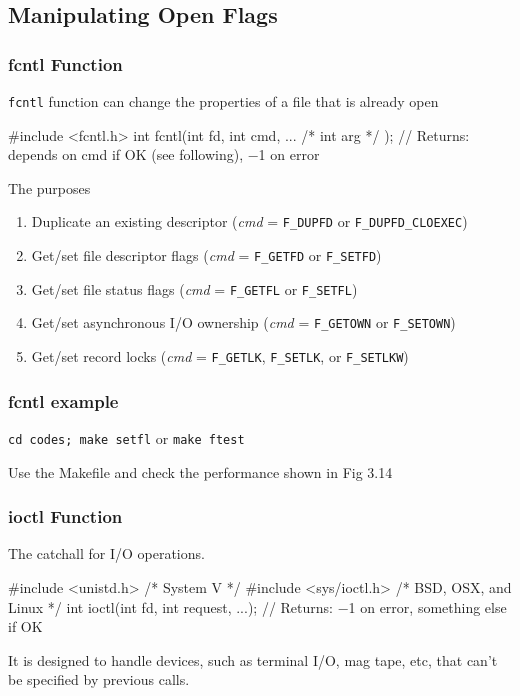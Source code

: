 \documentclass[newPxFont,sthlmFooter,nooffset]{beamer}
\begin{document}
\subsection{Manipulating Open Flags}
\begin{frame}[containsverbatim,t]
  \frametitle{fcntl Function}
\texttt{fcntl} function can change the properties of a file that is already open

\begin{codedef}
#include <fcntl.h>
int fcntl(int fd, int cmd, ... /* int arg */ );
// Returns: depends on cmd if OK (see following), −1 on error  
\end{codedef}

The purposes
\begin{enumerate}
\item  Duplicate an existing descriptor (\textit{cmd} = \texttt{F\_DUPFD} or \texttt{F\_DUPFD\_CLOEXEC})
\item Get/set file descriptor flags (\textit{cmd} = \texttt{F\_GETFD} or \texttt{F\_SETFD})
\item Get/set file status flags (\textit{cmd} = \texttt{F\_GETFL} or \texttt{F\_SETFL})
\item Get/set asynchronous I/O ownership (\textit{cmd} = \texttt{F\_GETOWN} or \texttt{F\_SETOWN})
\item Get/set record locks (\textit{cmd} = \texttt{F\_GETLK}, \texttt{F\_SETLK}, or \texttt{F\_SETLKW})
\end{enumerate}
\end{frame}

\begin{frame}[containsverbatim,t]
  \frametitle{fcntl example}

\texttt{cd codes; make setfl} or \texttt{make ftest}


Use the Makefile and check the performance shown in Fig 3.14


\end{frame}


\begin{frame}[containsverbatim,t]
  \frametitle{ioctl Function}
The catchall for I/O operations.

\begin{codedef}
#include <unistd.h>     /* System V */
#include <sys/ioctl.h>  /* BSD, OSX, and Linux */
int ioctl(int fd, int request, ...);
// Returns: −1 on error, something else if OK
\end{codedef}
\bigskip

It is designed to handle devices, such as terminal I/O, mag tape, etc, that can't be specified by previous calls.
\end{frame}
\end{document}
